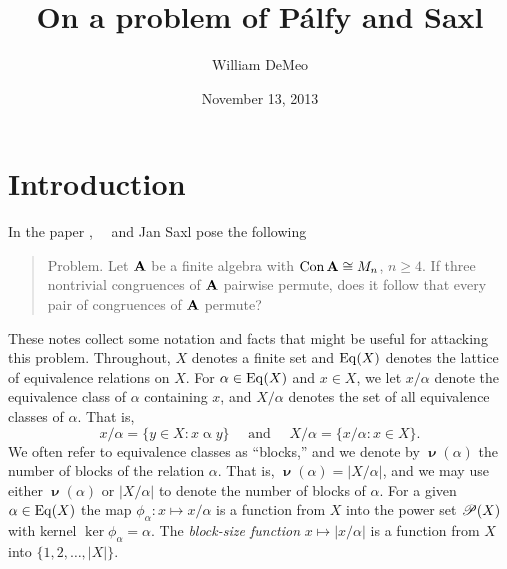 \newcommand{\rel}{\ensuremath{\mathrel}}
\newcommand{\ralpha}{\ensuremath{\mathrel{\alpha}}}
\newcommand{\rbeta}{\ensuremath{\mathrel{\beta}}}
\newcommand{\rgamma}{\ensuremath{\mathrel{\gamma}}}
\newcommand{\rdelta}{\ensuremath{\mathrel{\tau}}}
\newcommand{\rrho}{\ensuremath{\mathrel{\tau}}}
\newcommand{\rtau}{\ensuremath{\mathrel{\tau}}}
\newcommand{\rtheta}{\ensuremath{\mathrel{\theta}}}

\newcommand{\meet}{\ensuremath{\wedge}}
\newcommand{\join}{\ensuremath{\vee}}
\newcommand{\Meet}{\ensuremath{\bigwedge}}
\renewcommand{\Join}{\ensuremath{\bigvee}}
\newcommand{\nb}[1]{\ensuremath{\operatorname{\boldsymbol{\nu}}(#1)}}




\title{On a problem of P\'{a}lfy and Saxl}
\author{William DeMeo}
\date{November 13, 2013}

\maketitle

\section{Introduction}
In the paper \cite{PalfySaxl}, \Peter\ \Palfy\ and Jan Saxl pose the following 
\begin{quote}
  {\sc Problem.} Let $\mathbf{A}$ be a finite algebra with $\operatorname{Con} \mathbf{A} \cong M_n$, $n\geq
  4$. If three nontrivial congruences of $\mathbf{A}$ pairwise permute, does it follow
  that every pair of congruences of $\mathbf{A}$ permute?
\end{quote}

These notes collect some notation and facts that might be useful for attacking this problem.
Throughout, $X$ denotes a finite set and $\operatorname{Eq}(X)$ denotes the lattice of
equivalence relations on $X$. For $\alpha \in \operatorname{Eq}(X)$ and $x\in X$, we
let $x/\alpha$ denote the equivalence class of $\alpha$ containing $x$, and 
$X/\alpha$ denotes the set of all equivalence classes of $\alpha$. That is,
\[
x/\alpha = \{y\in X : x \mathrel{ \alpha } y\} \quad \text{ and } \quad
X/\alpha = \{x/\alpha : x\in X \}.
\]
We often refer to equivalence classes as
``blocks,'' and we denote by $\nb{\alpha}$ the number of blocks of the
relation $\alpha$. That is, $\nb{\alpha} = |X/\alpha|$, and we 
may use either $\nb{\alpha}$ or $|X/\alpha|$ to denote the number of 
blocks of $\alpha$.
For a given $\alpha\in \operatorname{Eq}(X)$ the map 
 $\phi_\alpha: x \mapsto x/\alpha$ is a
function from $X$ into the power set $\mathscr{P}(X)$
with kernel $\ker \phi_\alpha = \alpha$. 
The \emph{block-size function} $x \mapsto |x/\alpha|$ is a function from $X$ into $\{1,2,\dots, |X|\}$.

